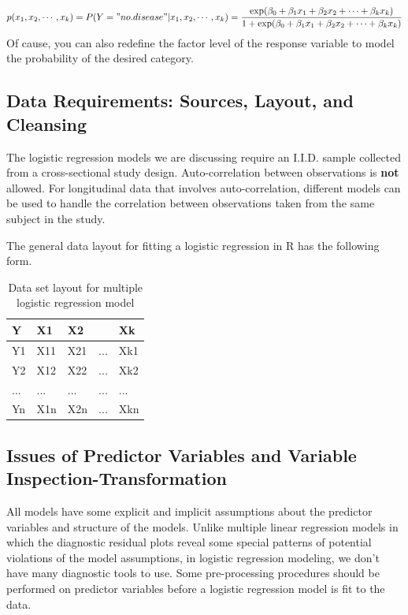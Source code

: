 \documentclass[
]{book}
\begin{document}
\[
p(x_1, x_2, \cdots, x_k)=P(Y="no.disease"|x_1, x_2, \cdots, x_k) =\frac{\exp(\beta_0 + \beta_1x_1 + \beta_2 x_2 + \cdots + \beta_kx_k)}{1+\exp(\beta_0 + \beta_1x_1 + \beta_2 x_2 + \cdots + \beta_kx_k)}
\]
Of cause, you can also redefine the factor level of the response variable to model the probability of the desired category.

\hypertarget{data-requirements-sources-layout-and-cleansing}{%
\subsection{Data Requirements: Sources, Layout, and Cleansing}\label{data-requirements-sources-layout-and-cleansing}}

The logistic regression models we are discussing require an I.I.D. sample collected from a cross-sectional study design. Auto-correlation between observations is \textbf{not} allowed. For longitudinal data that involves auto-correlation, different models can be used to handle the correlation between observations taken from the same subject in the study.

The general data layout for fitting a logistic regression in R has the following form.

\begin{table}

\caption{\label{tab:table2}Data set layout for multiple logistic regression model}
\centering
\begin{tabular}[t]{l|l|l|l|l}
\hline
Y & X1 & X2 &   & Xk\\
\hline
Y1 & X11 & X21 & ... & Xk1\\
\hline
Y2 & X12 & X22 & ... & Xk2\\
\hline
... & ... & ... & ... & ...\\
\hline
Yn & X1n & X2n & ... & Xkn\\
\hline
\end{tabular}
\end{table}

\hypertarget{issues-of-predictor-variables-and-variable-inspection-transformation}{%
\subsection{Issues of Predictor Variables and Variable Inspection-Transformation}\label{issues-of-predictor-variables-and-variable-inspection-transformation}}

All models have some explicit and implicit assumptions about the predictor variables and structure of the models. Unlike multiple linear regression models in which the diagnostic residual plots reveal some special patterns of potential violations of the model assumptions, in logistic regression modeling, we don't have many diagnostic tools to use. Some pre-processing procedures should be performed on predictor variables before a logistic regression model is fit to the data.
\end{document}
